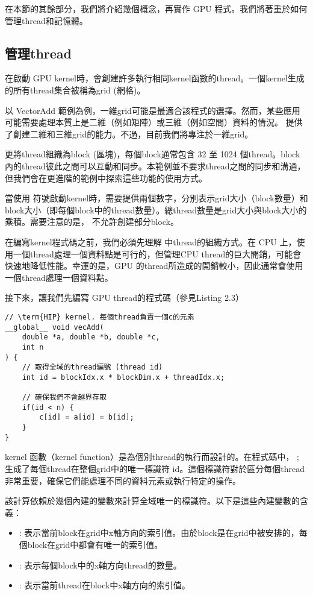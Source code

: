 在本節的其餘部分，我們將介紹幾個概念，再實作 GPU 程式。我們將著重於如何管理thread和記憶體。

\subsection{管理thread}
在啟動 GPU kernel時，會創建許多執行相同kernel函數的thread。一個kernel生成的所有thread集合被稱為grid (網格)。

以 VectorAdd 範例為例，一維grid可能是最適合該程式的選擇。然而，某些應用可能需要處理本質上是二維（例如矩陣）或三維（例如空間）資料的情況。 提供了創建二維和三維grid的能力。不過，目前我們將專注於一維grid。

 更將thread組織為block (區塊)，每個block通常包含 32 至 1024 個thread。block內的thread彼此之間可以互動和同步。本範例並不要求thread之間的同步和溝通，但我們會在更進階的範例中探索這些功能的使用方式。

當使用 \code{<<<>>>} 符號啟動kernel時，需要提供兩個數字，分別表示grid大小（block數量）和block大小（即每個block中的thread數量）。總thread數量是grid大小與block大小的乘積。需要注意的是， 不允許創建部分block。

在編寫kernel程式碼之前，我們必須先理解  中thread的組織方式。在 CPU 上，使用一個thread處理一個資料點是可行的，但管理CPU thread的巨大開銷，可能會快速地降低性能。幸運的是，GPU 的thread所造成的開銷較小，因此通常會使用一個thread處理一個資料點。

接下來，讓我們先編寫 GPU thread的程式碼（參見Listing 2.3）

\begin{lstlisting}[llanguage=C, caption={Vector\_add GPU kernel}, label={3rd:example}]
// \term{HIP} kernel. 每個thread負責一個c的元素
__global__ void vecAdd(
    double *a, double *b, double *c,
    int n
) {
    // 取得全域的thread編號 (thread id)
    int id = blockIdx.x * blockDim.x + threadIdx.x;

    // 確保我們不會越界存取
    if(id < n) {
        c[id] = a[id] = b[id];
    }
}
\end{lstlisting}

kernel 函數（kernel function）是為個別thread的執行而設計的。在程式碼中， ; 生成了每個thread在整個grid中的唯一標識符 id。這個標識符對於區分每個thread非常重要，確保它們能處理不同的資料元素或執行特定的操作。

該計算依賴於幾個內建的變數來計算全域唯一的標識符。以下是這些內建變數的含義：
\begin{itemize}
    \item {}: 表示當前block在grid中x軸方向的索引值。由於block是在grid中被安排的，每個block在grid中都會有唯一的索引值。
    \item {}: 表示每個block中的x軸方向thread的數量。
    \item {}: 表示當前thread在block中x軸方向的索引值。
\end{itemize}

